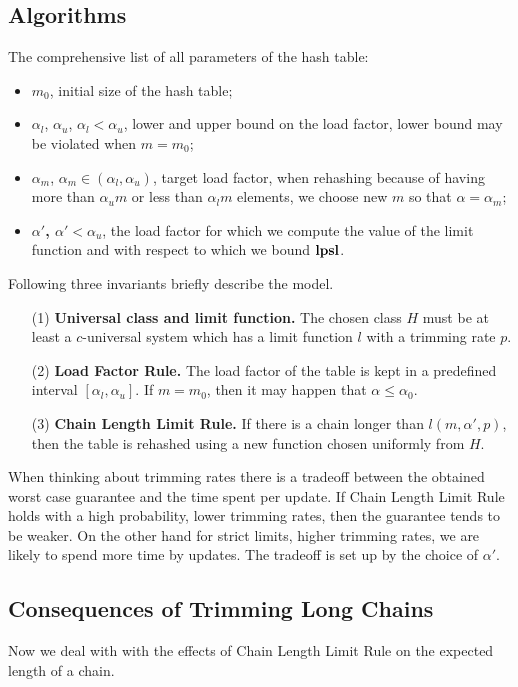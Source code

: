 \subsection{Algorithms}
The comprehensive list of all parameters of the hash table:
\begin{itemize}
	\item {$m_0$}, initial size of the hash table;
	\item {$\alpha_l$, $\alpha_u$, $\alpha_l < \alpha_u$}, lower and upper bound on the load factor, lower bound may be violated when $m = m_0$;
	\item {$\alpha_m$, $\alpha_m \in (\alpha_l, \alpha_u)$}, target load factor, when rehashing because of having more than $\alpha_u m$ or less than $\alpha_l m$ elements, we choose new $m$ so that $\alpha = \alpha_m$;
	\item \textbf{$\alpha'$, $\alpha' < \alpha_u$}, the load factor for which we compute the value of the limit function and with respect to which we bound $\mathbf{lpsl}$.
\end{itemize}
Following three invariants briefly describe the model. 
\begin{itemize}
\item[(1)] \textbf{Universal class and limit function.} The chosen class $H$ must be at least a $c$-universal system which has a limit function $l$ with a trimming rate $p$.
\item[(2)] \textbf{Load Factor Rule.} The load factor of the table is kept in a predefined interval $[\alpha_l, \alpha_u]$. If $m = m_0$, then it may happen that $\alpha \leq \alpha_0$.
\item[(3)] \textbf{Chain Length Limit Rule.} If there is a chain longer than $l(m, \alpha', p)$, then the table is rehashed using a new function chosen uniformly from $H$.
\end{itemize}

When thinking about trimming rates there is a tradeoff between the obtained worst case guarantee and the time spent per update.
If Chain Length Limit Rule holds with a high probability, lower trimming rates, then the guarantee tends to be weaker. 
On the other hand for strict limits, higher trimming rates, we are likely to spend more time by updates.
The tradeoff is set up by the choice of $\alpha'$.



\subsection{Consequences of Trimming Long Chains}
Now we deal with with the effects of Chain Length Limit Rule on the expected length of a chain.

